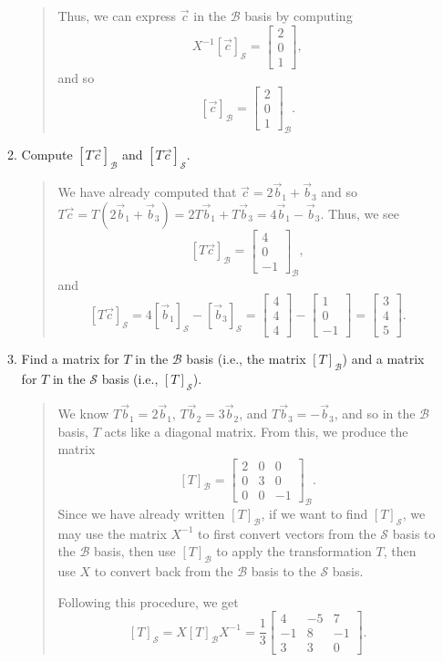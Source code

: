 \documentclass[letter]{article}
\newcommand{\mat}[1]{\begin{bmatrix}#1\end{bmatrix}}
\begin{document}
\begin{enumerate}
\begin{enumerate}
\begin{quote}
						Thus, we can express $\vec c$ in the $\mathcal B$ basis by computing 
						\[
							X^{-1}[\vec c]_{\mathcal S}=\mat{2\\0\\1},
						\]
						and so
						\[
							[\vec c]_{\mathcal B} = \mat{2\\0\\1}_{\mathcal B}.
						\]
					\end{quote}
				\item Compute $[T\vec c]_{\mathcal B}$ and $[T\vec c]_{\mathcal S}$.
					\begin{quote}
						We have already computed that $\vec c=2\vec b_1+\vec b_3$ and so
						$T\vec c=T(2\vec b_1+\vec b_3) = 2T\vec b_1+T\vec b_3 = 4\vec b_1-\vec b_3$.
						Thus, we see
						\[
							[T\vec c]_{\mathcal B} = \mat{4\\0\\-1}_{\mathcal B},
						\]
						and 
						\[
							[T\vec c]_{\mathcal S} = 4[\vec b_1]_{\mathcal S}-[\vec b_3]_{\mathcal S}
							= \mat{4\\4\\4}-\mat{1\\0\\-1} = \mat{3\\4\\5}.
						\]
					\end{quote}
				\item Find a matrix for $T$ in the $\mathcal B$ basis (i.e., 
					the matrix $[T]_{\mathcal B}$) and a matrix for $T$ in
					the $\mathcal S$ basis (i.e., $[T]_{\mathcal S}$).
					\begin{quote}
						We know $T\vec b_1=2\vec b_1$, $T\vec b_2=3\vec b_2$, and $T\vec b_3=-\vec b_3$,
						and so in the $\mathcal B$ basis, $T$ acts like a diagonal matrix.
						From this, we produce the matrix
						\[
							[T]_{\mathcal B} = \mat{2&0&0\\0&3&0\\0&0&-1}_{\mathcal B}.
						\]
						Since we have already written $[T]_\mathcal B$, if we want to find $[T]_{\mathcal S}$,
						we may use the matrix $X^{-1}$ to first convert vectors from the $\mathcal S$ basis
						to the $\mathcal B$ basis, then use $[T]_{\mathcal B}$ to apply the transformation $T$,
						then use $X$ to convert back from the $\mathcal B$ basis to the $\mathcal S$ basis.
						
						Following this procedure, we get
						\[
							[T]_{\mathcal S} = X[T]_{\mathcal B}X^{-1} = \frac{1}{3}\mat{4&-5&7\\-1&8&-1\\3&3&0}.
						\]
					\end{quote}
			\end{enumerate}
		

\end{enumerate}
\end{document}
